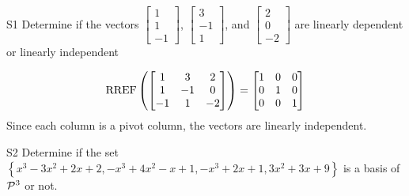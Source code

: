 \documentclass{sbgLAsemi}
\begin{document}
\begin{problem}{S1}
Determine if the vectors $\begin{bmatrix} 1 \\ 1 \\ -1 \end{bmatrix}$, $\begin{bmatrix} 3 \\ -1 \\ 1 \end{bmatrix}$, and $\begin{bmatrix} 2 \\ 0 \\ -2 \end{bmatrix}$ are linearly dependent or linearly independent
\end{problem}
\begin{solution}
$$\RREF\left(\begin{bmatrix} 1 & 3 & 2 \\ 1 & -1 & 0 \\ -1 & 1 & -2 \end{bmatrix} \right)= \begin{bmatrix} 1 & 0 &0 \\ 0 & 1 & 0 \\ 0 & 0 & 1\end{bmatrix}$$
Since each column is a pivot column, the vectors are linearly independent.
\end{solution}


\begin{problem}{S2}
Determine if the set $\left\{ x^3-3x^2+2x+2, -x^3+4x^2-x+1, -x^3+2x+1, 3x^2+3x+9 \right\}$ is a basis of $\P^3$ or not.
\end{problem}
\end{document}
